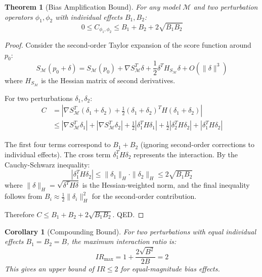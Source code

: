 \documentclass[11pt]{article}
\newtheorem{theorem}{Theorem}
\newtheorem{proof}{Proof}
\newtheorem{corollary}{Corollary}
\begin{document}
\begin{theorem}[Bias Amplification Bound]
For any model $\mathcal{M}$ and two perturbation operators $\phi_1, \phi_2$ with individual effects $B_1, B_2$:
\begin{equation}
0 \leq C_{\phi_1,\phi_2} \leq B_1 + B_2 + 2\sqrt{B_1 B_2}
\end{equation}
\end{theorem}

\begin{proof}
Consider the second-order Taylor expansion of the score function around $p_0$:
\begin{equation}
S_\mathcal{M}(p_0 + \delta) = S_\mathcal{M}(p_0) + \nabla S_\mathcal{M}^T \delta + \frac{1}{2}\delta^T H_{S_\mathcal{M}} \delta + O(\|\delta\|^3)
\end{equation}
where $H_{S_\mathcal{M}}$ is the Hessian matrix of second derivatives.

For two perturbations $\delta_1, \delta_2$:
\begin{align}
C &= \left| \nabla S_\mathcal{M}^T (\delta_1 + \delta_2) + \frac{1}{2}(\delta_1 + \delta_2)^T H (\delta_1 + \delta_2) \right| \\
&\leq |\nabla S_\mathcal{M}^T \delta_1| + |\nabla S_\mathcal{M}^T \delta_2| + \frac{1}{2}|\delta_1^T H \delta_1| + \frac{1}{2}|\delta_2^T H \delta_2| + |\delta_1^T H \delta_2|
\end{align}

The first four terms correspond to $B_1 + B_2$ (ignoring second-order corrections to individual effects). The cross term $\delta_1^T H \delta_2$ represents the interaction. By the Cauchy-Schwarz inequality:
\begin{equation}
|\delta_1^T H \delta_2| \leq \|\delta_1\|_H \cdot \|\delta_2\|_H \leq 2\sqrt{B_1 B_2}
\end{equation}
where $\|\delta\|_H = \sqrt{\delta^T H \delta}$ is the Hessian-weighted norm, and the final inequality follows from $B_i \approx \frac{1}{2}\|\delta_i\|_H^2$ for the second-order contribution.

Therefore $C \leq B_1 + B_2 + 2\sqrt{B_1 B_2}$. QED.
\end{proof}

\begin{corollary}[Compounding Bound]
For two perturbations with equal individual effects $B_1 = B_2 = B$, the maximum interaction ratio is:
\begin{equation}
IR_{\max} = 1 + \frac{2\sqrt{B^2}}{2B} = 2
\end{equation}
This gives an upper bound of $IR \leq 2$ for equal-magnitude bias effects.
\end{corollary}
\end{document}

